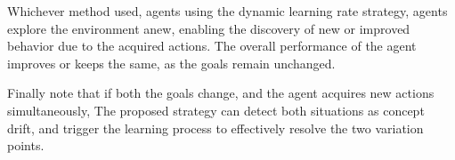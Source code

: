 Whichever method used, agents using the dynamic learning rate strategy, agents explore the 
environment anew, enabling the discovery of new or improved behavior due to the acquired actions. 
The overall performance of the agent improves or keeps the same, as the goals remain unchanged.

Finally note that if both the goals change, and the agent acquires new actions simultaneously, 
The proposed strategy can detect both situations as concept drift, and trigger the learning process 
to effectively resolve the two variation points.


\endinput

